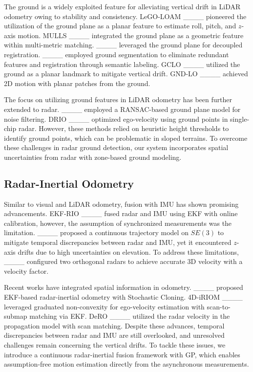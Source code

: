 The ground is a widely exploited feature for alleviating vertical drift in \ac{LiDAR} odometry owing to stability and consistency.
LeGO-LOAM ____ pioneered the utilization of the ground plane as a planar feature to estimate roll, pitch, and $z$-axis motion. MULLS ____ integrated the ground plane as a geometric feature within multi-metric matching. ____ leveraged the ground plane for decoupled registration.
____ employed ground segmentation to eliminate redundant features and registration through semantic labeling.
GCLO ____ utilized the ground as a planar landmark to mitigate vertical drift. GND-LO ____ achieved 2D motion with planar patches from the ground.

The focus on utilizing ground features in LiDAR odometry has been further extended to radar. ____ employed a RANSAC-based ground plane model for noise filtering. DRIO ____ optimized ego-velocity using ground points in single-chip radar. However, these methods relied on heuristic height thresholds to identify ground points, which can be problematic in sloped terrains.
To overcome these challenges in radar ground detection, our system incorporates spatial uncertainties from radar with zone-based ground modeling.

\subsection{Radar-Inertial Odometry}

Similar to visual and \ac{LiDAR} odometry, fusion with \ac{IMU} has shown promising advancements. EKF-RIO ____ fused radar and \ac{IMU} using \ac{EKF} with online calibration, however, the assumption of synchronized measurements was the limitation. ____ proposed a continuous trajectory model on $SE(3)$ to mitigate temporal discrepancies between radar and \ac{IMU}, yet it encountered $z$-axis drifts due to high uncertainties on elevation. To address these limitations, ____ configured two orthogonal radars to achieve accurate 3D velocity with a velocity factor.

Recent works have integrated spatial information in odometry. ____ proposed \ac{EKF}-based radar-inertial odometry with Stochastic Cloning.
4D-iRIOM ____ leveraged graduated non-convexity for ego-velocity estimation with scan-to-submap matching via \ac{EKF}.
DeRO ____ utilized the radar velocity in the propagation model with scan matching.
Despite these advances, temporal discrepancies between radar and \ac{IMU} are still overlooked, and unresolved challenges remain concerning the vertical drifts. 
To tackle these issues, we introduce a continuous radar-inertial fusion framework with \ac{GP}, which enables assumption-free motion estimation directly from the asynchronous measurements.
